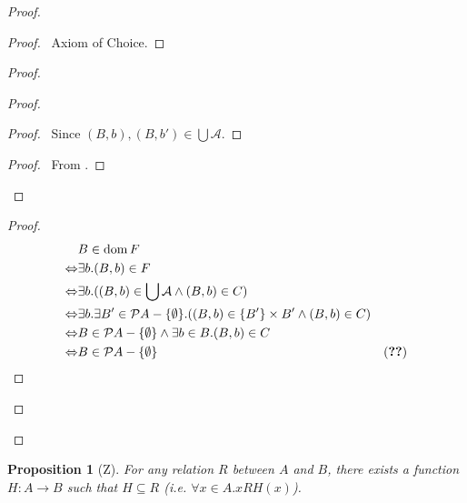 \documentclass{book}
\let\qed\relax
\newtheorem{prop}[ax]{Proposition}
\theoremstyle{definition}
\newcommand{\dom}{\ensuremath{\operatorname{dom}}}
\newcommand{\ran}{\ensuremath{\operatorname{ran}}}
\begin{document}
\begin{proof}
\pf
{}
\begin{proof}
	\pf\ Axiom of Choice.
\end{proof}
\begin{proof}
	\begin{proof}
		\begin{proof}
			\pf\ Since $(B,b),(B,b') \in \bigcup \mathcal{A}$.
		\end{proof}
		\begin{proof}
			\pf\ From .
		\end{proof}
	\end{proof}
	\step{b}{$\dom F = \mathcal{P} A - \{ \emptyset \}$}
	\begin{proof}
		\pf
		\begin{align*}
			& B \in \dom F \\
			\Leftrightarrow & \exists b. (B,b) \in F \\
			\Leftrightarrow & \exists b. ((B,b) \in \bigcup \mathcal{A} \wedge (B,b) \in C) \\
			\Leftrightarrow & \exists b. \exists B' \in \mathcal{P} A - \{ \emptyset \}. ((B,b) \in \{ B' \} \times B' \wedge (B,b) \in C) \\
			\Leftrightarrow & B \in \mathcal{P} A - \{ \emptyset \} \wedge \exists b \in B. (B,b) \in C \\
			\Leftrightarrow & B \in \mathcal{P} A - \{ \emptyset \} & (\text{\stepref{5}})
		\end{align*}
	\end{proof}
	\step{c}{$\ran F \subseteq A$}
\end{proof}
\qed
\end{proof}

\begin{prop}[Z]
\label{prop:AxChoice}
For any relation $R$ between $A$ and $B$, there exists a function $H : A \rightarrow B$ such that $H \subseteq R$ (i.e. $\forall x \in A. xRH(x)$).
\end{prop}
\end{document}
